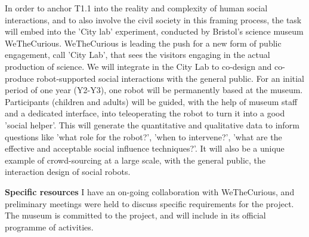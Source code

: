 In order to anchor T1.1 into the reality and complexity of human social
interactions, and to also involve the civil society in this framing process, the
task will embed \project into the 'City lab' experiment, conducted by Bristol's
science museum WeTheCurious. WeTheCurious is leading the push for a new form of
public engagement, call 'City Lab', that sees the visitors engaging in the
actual production of science. We will integrate \project in the City Lab to
co-design and co-produce robot-supported social interactions with the general
public. For an initial period of one year (Y2-Y3), one \project robot will be
permanently based at the museum.  Participants (children and adults) will be
guided, with the help of museum staff and a dedicated interface, into
teleoperating the robot to turn it into a good 'social helper'. This will generate
the quantitative and qualitative data to inform questions like 'what role for
the robot?', 'when to intervene?', 'what are the effective and acceptable social
influence techniques?'. It will also be a unique example of crowd-sourcing at a
large scale, with the general public, the interaction design of social robots.

\textbf{Specific resources} I have an on-going collaboration with WeTheCurious,
and preliminary meetings were held to discuss specific requirements for the
\project project. The museum is committed to the project, and will include
\project in its official programme of activities.

% 
% 
% 
% 
% 
% 
% 
% 
% 



